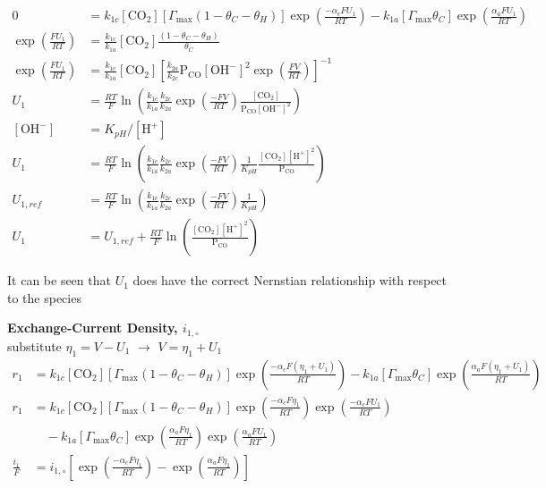\documentclass[12pt]{article}
\begin{document}
  \begin{equation*}
  \begin{split}
    0 &= k_{1c} [{\text{CO}_2}] \left[\Gamma_{\max} (1 - \theta_C - \theta_H) \right] \exp{ \left( \frac{-\alpha_c F U_1}{RT} \right)}
    - k_{1a} \left[\Gamma_{\max} \theta_C \right] \exp{\left( \frac{\alpha_a F U_1}{RT} \right)}
    \\
    \exp{ \left( \frac{FU_1}{RT} \right)} &=
    \frac{k_{1c}}{k_{1a}} [{\text{CO}_2}] \frac{(1 - \theta_C - \theta_H)}{\theta_C}
    \\
    \exp{ \left( \frac{FU_1}{RT} \right)} &=
    \frac{k_{1c}}{k_{1a}} [{\text{CO}_2}] \left[ \frac{k_{2a}}{k_{2c}} \text{P}_{\text{CO}} \left[\text{OH}^- \right]^2 \exp{ \left( \frac{F V}{RT} \right)} \right]^{-1}
    \\
    U_1 &= \frac{RT}{F} \ln{ \left( \frac{k_{1c}}{k_{1a}} \frac{k_{2c}}{k_{2a}} \exp{ \left( \frac{-F V}{RT} \right)}
    \frac{[{\text{CO}_2}]}{\text{P}_{\text{CO}} \left[\text{OH}^- \right]^2} \right)}
    \\
    [\text{OH}^-] &= K_{pH} / [\text{H}^+]
    \\
    U_1 &= \frac{RT}{F} \ln{ \left( \frac{k_{1c}}{k_{1a}} \frac{k_{2c}}{k_{2a}} \exp{ \left( \frac{-F V}{RT} \right)} \frac{1}{K_{pH}}
    \frac{[{\text{CO}_2}][\text{H}^+]^2}{\text{P}_{\text{CO}}} \right)}
    \\
    U_{1,ref} &= \frac{RT}{F} \ln{ \left( \frac{k_{1c}}{k_{1a}} \frac{k_{2c}}{k_{2a}} \exp{ \left( \frac{-F V}{RT} \right)} \frac{1}{K_{pH}} \right) }
    \\
    U_1 &= U_{1,ref} + \frac{RT}{F} \ln{ \left( \frac{[{\text{CO}_2}][\text{H}^+]^2}{\text{P}_{\text{CO}}} \right)}
  \end{split}
  \end{equation*}

  It can be seen that $U_1$ does have the correct Nernstian relationship with respect to the species

  \clearpage
  \textbf{Exchange-Current Density, $i_{1,\circ}$} \\
  substitute $ \eta_1 = V - U_1$ $\rightarrow$ $ V = \eta_1 + U_1$
  \begin{equation*}
  \begin{split}
    r_1 &= k_{1c} [{\text{CO}_2}] \left[\Gamma_{\max} (1 - \theta_C - \theta_H) \right] \exp{ \left( \frac{-\alpha_c F (\eta_1 + U_1)}{RT} \right)}
    - k_{1a} \left[\Gamma_{\max} \theta_C \right] \exp{\left( \frac{\alpha_a F (\eta_1 + U_1)}{RT} \right)}
    \\
    r_1 &= k_{1c} [{\text{CO}_2}] \left[\Gamma_{\max} (1 - \theta_C - \theta_H) \right] \exp{ \left( \frac{-\alpha_c F \eta_1}{RT} \right)} \exp{ \left( \frac{-\alpha_c F U_1}{RT} \right)} \\
    & \quad - k_{1a} \left[\Gamma_{\max} \theta_C \right] \exp{\left( \frac{\alpha_a F \eta_1}{RT} \right)} \exp{\left( \frac{\alpha_a F U_1}{RT} \right)}
    \\
    \frac{i_1}{F} &= i_{1,\circ} \left[ \exp{\left( \frac{-\alpha_c F \eta_1}{RT} \right)} -\exp{\left( \frac{\alpha_a F \eta_1}{RT} \right)}  \right]
  \end{split}
  \end{equation*}
\end{document}
